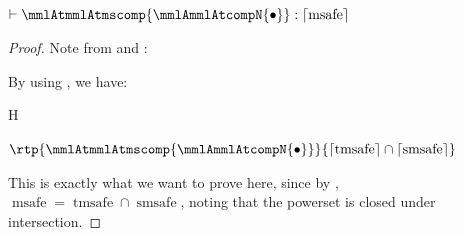 \documentclass[a4paper,names,dvipsnames]{article}
\begin{document}
\begin{scontents}[store-env=buffer]
  $\;$\\
  \begin{goals}
    \item $\vdash\mmlAtmmlAtmscomp{\mmlAmmlAtcompN{\bullet}}:\lceil\operatorname{msafe}\rceil$
  \end{goals}
\end{scontents}
\begin{proof}
  Note from  and :
  By  using , we have:
  \begin{passumptions}{H}
    \item $\rtp{\mmlAtmmlAtmscomp{\mmlAmmlAtcompN{\bullet}}}{\lceil\operatorname{tmsafe}\rceil\cap\lceil\operatorname{smsafe}\rceil}$
  \end{passumptions}
  This is exactly what we want to prove here, since by , $\operatorname{msafe}=\operatorname{tmsafe}\cap\operatorname{smsafe}$, noting that the powerset is closed under intersection.
\end{proof}
\end{document}
